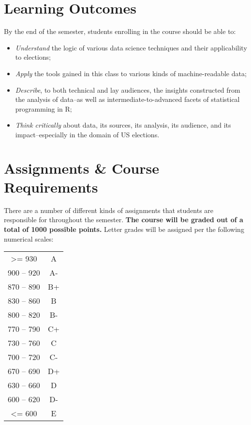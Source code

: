 \documentclass[11pt]{article}
\begin{document}
\section{Learning Outcomes} 
By the end of the semester, students enrolling in the course should be able to:
\begin{itemize}
\item \textit{Understand} the logic of various data science techniques and their applicability to elections;
\item \textit{Apply} the tools gained in this class to various kinds of machine-readable data;
\item \textit{Describe}, to both technical and lay audiences, the insights constructed from the analysis of data--as well as intermediate-to-advanced facets of statistical programming in R; 
\item \textit{Think critically} about data, its sources, its analysis, its audience, and its impact--especially in the domain of US elections. 
\end{itemize}
\newpage
\section{Assignments \& Course Requirements}
There are a number of different kinds of assignments that students are responsible for throughout the semester. \textbf{The course will be graded out of a total of 1000 possible points.} Letter grades will be assigned per the following numerical scales:
\begin{table}[H]
\centering
\begin{tabular}{ c c}
\textgreater= 930 & A  \\
900 -- 920 & A- \\
870 -- 890 & B+ \\
830 -- 860 & B \\
800 -- 820 & B- \\
770 -- 790 & C+ \\
730 -- 760 & C \\
700 -- 720 & C- \\
670 -- 690 & D+ \\
630 -- 660 & D \\
600 -- 620 & D- \\
\textless= 600 & E \\
\end{tabular}
\end{table}
\end{document}
